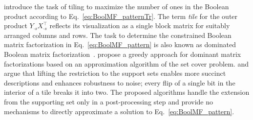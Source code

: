 \cite{geerts2004tiling} introduce the task of tiling to maximize the number of ones in the Boolean product according to Eq.~\eqref{eq:BoolMF_patternTr}. The term \emph{tile} for the outer product $Y_{\cdot s}X_{\cdot s}^\top$ reflects its visualization as a single block matrix for suitably arranged columns and rows. The task to determine the constrained Boolean matrix factorization in Eq.~\eqref{eq:BoolMF_pattern} is also known as dominated Boolean matrix factorization~\citep{miettinen2010sparse}. \cite{belohlavek2010discovery,belohlavek2015below} propose a greedy approach for dominant matrix factorizations based on an approximation algorithm of the set cover problem. 
\cite{kontonasios2010information} and \cite{xiang2011summarizing} argue that lifting the restriction to the support sets enables more succinct descriptions and enhances robustness to noise; every flip of a single bit in the interior of a tile breaks it into two. The proposed algorithms handle the extension from the supporting set only in a post-processing step and provide no mechanisms to directly approximate a solution to Eq.~\eqref{eq:BoolMF_pattern}.

